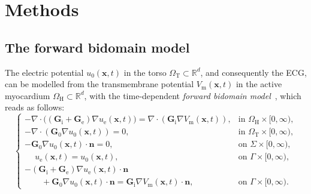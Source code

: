 \documentclass[runningheads]{llncs}
\newcommand{\ue}{u_\mathrm{e}}
\newcommand{\Vm}{V_\mathrm{m}}
\newcommand{\vz}{\mathbf{z}}
\newcommand{\vx}{\mathbf{x}}
\newcommand{\vn}{\mathbf{n}}
\newcommand{\tG}{\mathbf{G}}
\newcommand{\tGi}{\tG_\mathrm{i}}
\newcommand{\tGe}{\tG_\mathrm{e}}
\newcommand{\tGm}{\tG_\mathrm{m}}
\newcommand{\Cm}{C_\mathrm{m}}
\newcommand{\fion}{f_\mathrm{ion}}
\newcommand{\R}{\mathbb{R}}
\newcommand{\OmegaH}{\Omega_\mathrm{H}}
\newcommand{\OmegaT}{\Omega_\mathrm{T}}
\begin{document}
\section{Methods}
\label{sec:meth}

\subsection{The forward bidomain model}
The electric potential $u_0(\vx,t)$ in the torso $\OmegaT\subset\R^d$,
and consequently the ECG, can be modelled from the transmembrane potential
$\Vm(\vx,t)$ in the active myocardium $\OmegaH\subset\R^d$,
with the time-dependent \emph{forward bidomain model}~\cite{potse2006},
which reads as follows:
\begin{equation}\label{eq:bidomain}
\begin{cases}
-\nabla\cdot\bigl((\tGi+\tGe)\nabla\ue(\vx,t)\bigr)  = \nabla\cdot(\tGi\nabla\Vm(\vx,t)),
& \mbox{in $\OmegaH\times[0,\infty)$}, \\
-\nabla\cdot(\tG_0\nabla u_0(\vx,t)) = 0, & \mbox{in $\OmegaT\times[0,\infty)$}, \\
-\tG_0\nabla u_0(\vx,t)\cdot\vn = 0, & \mbox{on $\Sigma\times[0,\infty)$}, \\
\phantom{-}\ue(\vx,t) = u_0(\vx,t), & \mbox{on $\Gamma\times[0,\infty)$}, \\
-(\tGi+\tGe)\nabla\ue(\vx,t)\cdot\vn & \\
\qquad{} + \tG_0\nabla u_0(\vx,t)\cdot\vn = \tGi\nabla\Vm(\vx,t)\cdot\vn, &
\mbox{on $\Gamma\times[0,\infty)$}.
\end{cases}
\end{equation}
\end{document}
